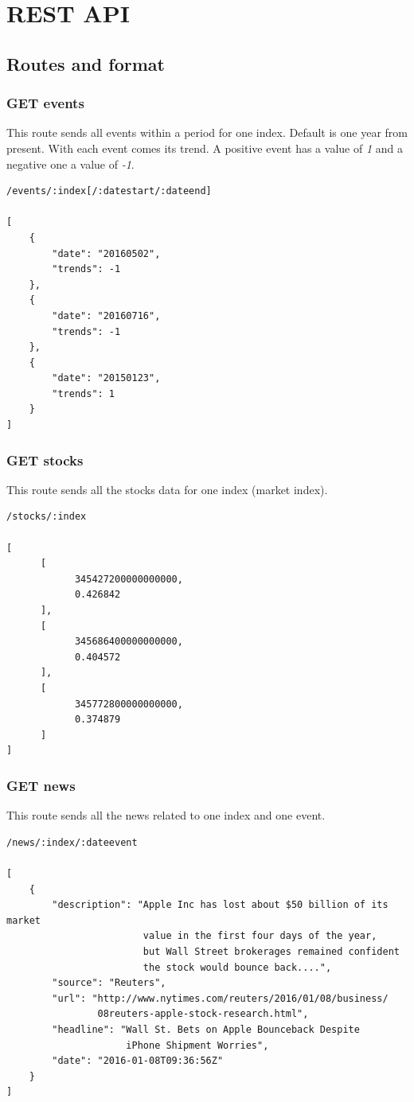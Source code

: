\section{REST API}

\subsection{Routes and format}

\subsubsection*{GET events}
This route sends all events within a period for one index. Default is one year from present. With each event comes its trend. A positive event has a value of \textit{1} and a negative one a value of \textit{-1}.
\begin{verbatim}
/events/:index[/:datestart/:dateend]

[
    {
        "date": "20160502",
        "trends": -1
    },
    {
        "date": "20160716",
        "trends": -1
    },
    {
        "date": "20150123",
        "trends": 1
    }
]
\end{verbatim}

\subsubsection*{GET stocks}
This route sends all the stocks data for one index (market index).
\begin{verbatim}
/stocks/:index

[
      [
            345427200000000000,
            0.426842
      ],
      [
            345686400000000000,
            0.404572
      ],
      [
            345772800000000000,
            0.374879
      ]
]
\end{verbatim}

\subsubsection*{GET news}
This route sends all the news related to one index and one event.
\begin{verbatim}
/news/:index/:dateevent

[
    {
        "description": "Apple Inc has lost about $50 billion of its market
                        value in the first four days of the year,
                        but Wall Street brokerages remained confident
                        the stock would bounce back....",
        "source": "Reuters",
        "url": "http://www.nytimes.com/reuters/2016/01/08/business/
                08reuters-apple-stock-research.html",
        "headline": "Wall St. Bets on Apple Bounceback Despite
                     iPhone Shipment Worries",
        "date": "2016-01-08T09:36:56Z"
    }
]
\end{verbatim}

